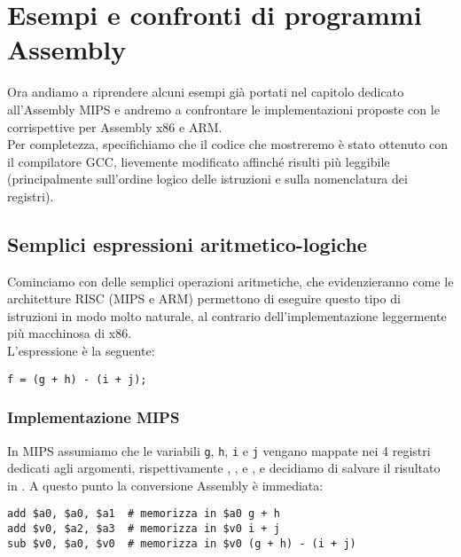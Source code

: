 \documentclass[class=book, crop=false, oneside]{standalone}
\begin{document}
\chapter{Esempi e confronti di programmi Assembly}
Ora andiamo a riprendere alcuni esempi già portati nel capitolo dedicato all'Assembly MIPS e andremo a confrontare le implementazioni proposte con le corrispettive per Assembly x86 e ARM.\\
Per completezza, specifichiamo che il codice che mostreremo è stato ottenuto con il compilatore GCC, lievemente modificato affinché risulti più leggibile (principalmente sull'ordine logico delle istruzioni e sulla nomenclatura dei registri).

\section{Semplici espressioni aritmetico-logiche}
Cominciamo con delle semplici operazioni aritmetiche, che evidenzieranno come le architetture RISC (MIPS e ARM) permettono di eseguire questo tipo di istruzioni in modo molto naturale, al contrario dell'implementazione leggermente più macchinosa di x86.\\
L'espressione è la seguente:
\begin{verbatim}
f = (g + h) - (i + j);
\end{verbatim}

\subsection*{Implementazione MIPS}
In MIPS assumiamo che le variabili \texttt{g}, \texttt{h}, \texttt{i} e \texttt{j} vengano mappate nei 4 registri dedicati agli argomenti, rispettivamente , ,  e , e decidiamo di salvare il risultato in . A questo punto la conversione Assembly è immediata:
\begin{verbatim}
add $a0, $a0, $a1  # memorizza in $a0 g + h
add $v0, $a2, $a3  # memorizza in $v0 i + j
sub $v0, $a0, $v0  # memorizza in $v0 (g + h) - (i + j)
\end{verbatim}
\end{document}
